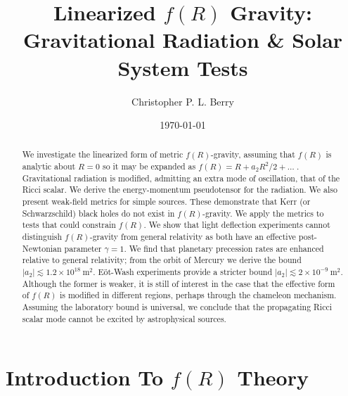 \documentclass[aps,prd,amsfonts,amssymb,amsmath,nofootinbib,reprint,showpacs]{revtex4-1}
\newcommand{\units}[1]{\ensuremath{~\mathrm{#1}}}
\begin{document}

\title{Linearized $f(R)$ Gravity: Gravitational Radiation \& Solar System Tests}

\author{Christopher P. L. Berry}

\date{\today}

\begin{abstract}
We investigate the linearized form of metric $f(R)$-gravity, assuming that $f(R)$ is analytic about $R = 0$ so it may be expanded as $f(R) = R + a_2R^2/2 + \ldots\;$. Gravitational radiation is modified, admitting an extra mode of oscillation, that of the Ricci scalar. We derive the energy-momentum pseudotensor for the radiation. We also present weak-field metrics for simple sources. These demonstrate that Kerr (or Schwarzschild) black holes do not exist in $f(R)$-gravity. We apply the metrics to tests that could constrain $f(R)$. We show that light deflection experiments cannot distinguish $f(R)$-gravity from general relativity as both have an effective post-Newtonian parameter $\gamma = 1$. We find that planetary precession rates are enhanced relative to general relativity; from the orbit of Mercury we derive the bound $|a_2| \lesssim 1.2 \times 10^{18}\units{m^2}$. E\"ot-Wash experiments provide a stricter bound $|a_2| \lesssim 2 \times 10^{-9}\units{m^2}$. Although the former is weaker, it is still of interest in the case that the effective form of $f(R)$ is modified in different regions, perhaps through the chameleon mechanism. Assuming the laboratory bound is universal, we conclude that the propagating Ricci scalar mode cannot be excited by astrophysical sources.
\end{abstract}


\maketitle

\section{Introduction To $f(R)$ Theory}
\end{document}
